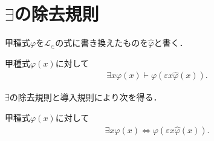 \section{$\exists$の除去規則}
	甲種式$\varphi$を$\mathcal{L}_{\in}$の式に書き換えたものを$\hat{\varphi}$と書く．
	
	\begin{screen}
		\begin{logicalaxm}
			甲種式$\varphi(x)$に対して
			\begin{align}
				\exists x \varphi(x) \vdash 
				\varphi\left(\varepsilon x \hat{\varphi}(x)\right).
			\end{align}
		\end{logicalaxm}
	\end{screen}
	
	$\exists$の除去規則と導入規則により次を得る．

	\begin{screen}
		\begin{thm}
			甲種式$\varphi(x)$に対して
			\begin{align}
				\exists x \varphi(x) \Longleftrightarrow
				\varphi\left(\varepsilon x \hat{\varphi}(x)\right).
			\end{align}
		\end{thm}
	\end{screen}